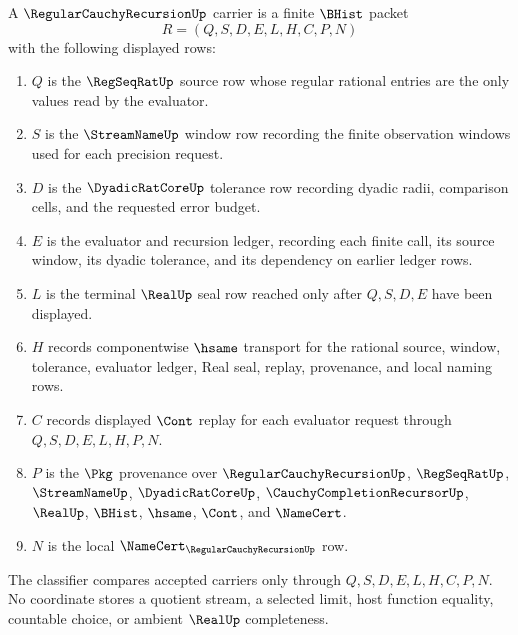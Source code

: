 \begin{definition}
\label{def:regular-cauchy-recursion-carrier}
A $\RegularCauchyRecursionUp$ carrier is a finite $\BHist$ packet
$$
R=(Q,S,D,E,L,H,C,P,N)
$$
with the following displayed rows:
\begin{enumerate}
\item $Q$ is the $\RegSeqRatUp$ source row whose regular rational entries are the only values read by the evaluator.
\item $S$ is the $\StreamNameUp$ window row recording the finite observation windows used for each precision request.
\item $D$ is the $\DyadicRatCoreUp$ tolerance row recording dyadic radii, comparison cells, and the requested error budget.
\item $E$ is the evaluator and recursion ledger, recording each finite call, its source window, its dyadic tolerance, and its dependency on earlier ledger rows.
\item $L$ is the terminal $\RealUp$ seal row reached only after $Q,S,D,E$ have been displayed.
\item $H$ records componentwise $\hsame$ transport for the rational source, window, tolerance, evaluator ledger, Real seal, replay, provenance, and local naming rows.
\item $C$ records displayed $\Cont$ replay for each evaluator request through $Q,S,D,E,L,H,P,N$.
\item $P$ is the $\Pkg$ provenance over $\RegularCauchyRecursionUp$, $\RegSeqRatUp$, $\StreamNameUp$, $\DyadicRatCoreUp$, $\CauchyCompletionRecursorUp$, $\RealUp$, $\BHist$, $\hsame$, $\Cont$, and $\NameCert$.
\item $N$ is the local $\NameCert_{\RegularCauchyRecursionUp}$ row.
\end{enumerate}
The classifier compares accepted carriers only through $Q,S,D,E,L,H,C,P,N$. No coordinate stores a quotient stream, a selected limit, host function equality, countable choice, or ambient $\RealUp$ completeness.
\end{definition}

